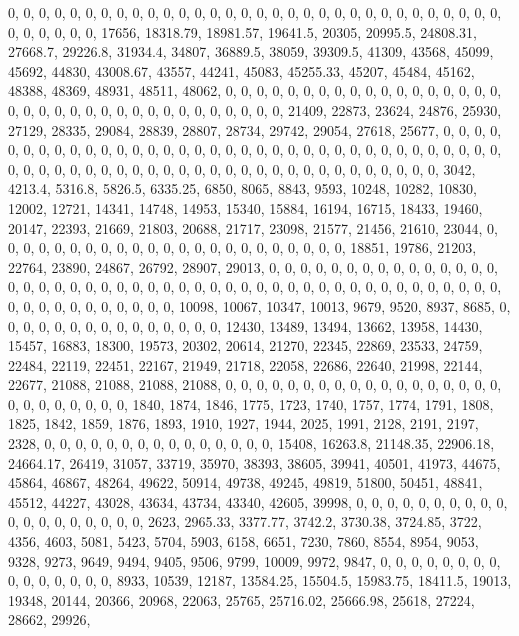 \documentclass[
]{article}
\begin{document}
0, 0, 0, 0, 0, 0, 0, 0, 0, 0, 0, 0, 0, 0, 0, 0, 0, 0, 0, 0, 0, 0, 0, 0,
0, 0, 0, 0, 0, 0, 0, 0, 0, 0, 0, 0, 0, 0, 17656, 18318.79, 18981.57,
19641.5, 20305, 20995.5, 24808.31, 27668.7, 29226.8, 31934.4, 34807,
36889.5, 38059, 39309.5, 41309, 43568, 45099, 45692, 44830, 43008.67,
43557, 44241, 45083, 45255.33, 45207, 45484, 45162, 48388, 48369, 48931,
48511, 48062, 0, 0, 0, 0, 0, 0, 0, 0, 0, 0, 0, 0, 0, 0, 0, 0, 0, 0, 0,
0, 0, 0, 0, 0, 0, 0, 0, 0, 0, 0, 0, 0, 0, 0, 0, 0, 21409, 22873, 23624,
24876, 25930, 27129, 28335, 29084, 28839, 28807, 28734, 29742, 29054,
27618, 25677, 0, 0, 0, 0, 0, 0, 0, 0, 0, 0, 0, 0, 0, 0, 0, 0, 0, 0, 0,
0, 0, 0, 0, 0, 0, 0, 0, 0, 0, 0, 0, 0, 0, 0, 0, 0, 0, 0, 0, 0, 0, 0, 0,
0, 0, 0, 0, 0, 0, 0, 0, 0, 0, 0, 0, 0, 0, 0, 0, 0, 0, 0, 0, 0, 3042,
4213.4, 5316.8, 5826.5, 6335.25, 6850, 8065, 8843, 9593, 10248, 10282,
10830, 12002, 12721, 14341, 14748, 14953, 15340, 15884, 16194, 16715,
18433, 19460, 20147, 22393, 21669, 21803, 20688, 21717, 23098, 21577,
21456, 21610, 23044, 0, 0, 0, 0, 0, 0, 0, 0, 0, 0, 0, 0, 0, 0, 0, 0, 0,
0, 0, 0, 0, 0, 0, 18851, 19786, 21203, 22764, 23890, 24867, 26792,
28907, 29013, 0, 0, 0, 0, 0, 0, 0, 0, 0, 0, 0, 0, 0, 0, 0, 0, 0, 0, 0,
0, 0, 0, 0, 0, 0, 0, 0, 0, 0, 0, 0, 0, 0, 0, 0, 0, 0, 0, 0, 0, 0, 0, 0,
0, 0, 0, 0, 0, 0, 0, 0, 0, 0, 0, 0, 0, 0, 0, 10098, 10067, 10347, 10013,
9679, 9520, 8937, 8685, 0, 0, 0, 0, 0, 0, 0, 0, 0, 0, 0, 0, 0, 0, 0,
12430, 13489, 13494, 13662, 13958, 14430, 15457, 16883, 18300, 19573,
20302, 20614, 21270, 22345, 22869, 23533, 24759, 22484, 22119, 22451,
22167, 21949, 21718, 22058, 22686, 22640, 21998, 22144, 22677, 21088,
21088, 21088, 21088, 0, 0, 0, 0, 0, 0, 0, 0, 0, 0, 0, 0, 0, 0, 0, 0, 0,
0, 0, 0, 0, 0, 0, 0, 0, 0, 1840, 1874, 1846, 1775, 1723, 1740, 1757,
1774, 1791, 1808, 1825, 1842, 1859, 1876, 1893, 1910, 1927, 1944, 2025,
1991, 2128, 2191, 2197, 2328, 0, 0, 0, 0, 0, 0, 0, 0, 0, 0, 0, 0, 0, 0,
0, 15408, 16263.8, 21148.35, 22906.18, 24664.17, 26419, 31057, 33719,
35970, 38393, 38605, 39941, 40501, 41973, 44675, 45864, 46867, 48264,
49622, 50914, 49738, 49245, 49819, 51800, 50451, 48841, 45512, 44227,
43028, 43634, 43734, 43340, 42605, 39998, 0, 0, 0, 0, 0, 0, 0, 0, 0, 0,
0, 0, 0, 0, 0, 0, 0, 0, 0, 2623, 2965.33, 3377.77, 3742.2, 3730.38,
3724.85, 3722, 4356, 4603, 5081, 5423, 5704, 5903, 6158, 6651, 7230,
7860, 8554, 8954, 9053, 9328, 9273, 9649, 9494, 9405, 9506, 9799, 10009,
9972, 9847, 0, 0, 0, 0, 0, 0, 0, 0, 0, 0, 0, 0, 0, 0, 0, 8933, 10539,
12187, 13584.25, 15504.5, 15983.75, 18411.5, 19013, 19348, 20144, 20366,
20968, 22063, 25765, 25716.02, 25666.98, 25618, 27224, 28662, 29926,
\end{document}

